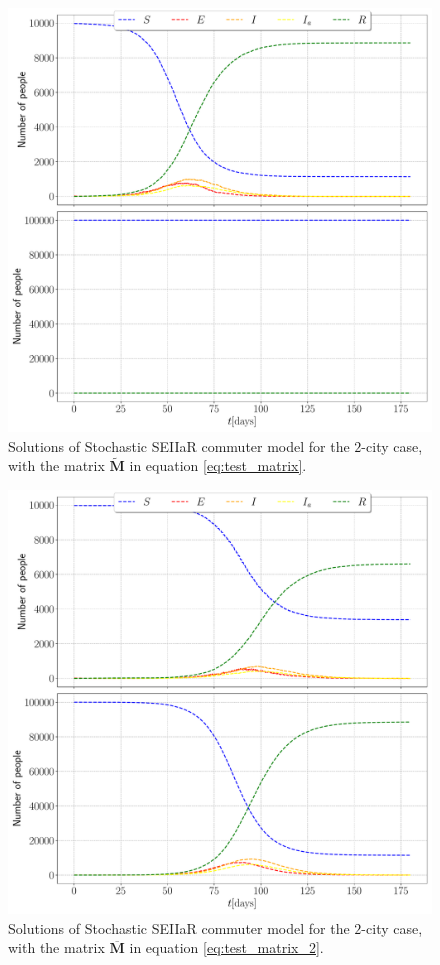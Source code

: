 \begin{figure}[htb]
	\centering
	\includegraphics[width=0.6\columnwidth]{../fig/test_commuter.pdf}
	\caption{Solutions of Stochastic SEIIaR commuter model for the $2$-city case, with the matrix $\mathbf{\widetilde{M}}$ in equation \eqref{eq:test_matrix}.}
	\label{fig:test_commuter}
\end{figure}

\begin{figure}[htb]
	\centering
	\includegraphics[width=0.6\columnwidth]{../fig/test_commuter_2.pdf}
	\caption{Solutions of Stochastic SEIIaR commuter model for the $2$-city case, with the matrix $\mathbf{\overline{M}}$ in equation \eqref{eq:test_matrix_2}.}
	\label{fig:test_commuter_2}
\end{figure}

\clearpage